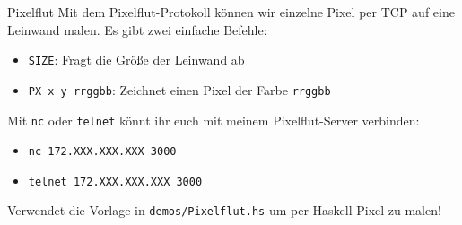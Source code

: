 \documentclass{beamer}
\begin{document}
\begin{frame}{Pixelflut}
  Mit dem Pixelflut-Protokoll können wir einzelne Pixel per TCP auf eine Leinwand malen.
  Es gibt zwei einfache Befehle:

  \begin{itemize}
    \item \texttt{SIZE}: Fragt die Größe der Leinwand ab
    \item \texttt{PX x y rrggbb}: Zeichnet einen Pixel der Farbe \texttt{rrggbb}
  \end{itemize}

  Mit \texttt{nc} oder \texttt{telnet} könnt ihr euch mit meinem Pixelflut-Server verbinden:

  \begin{itemize}
    \item \texttt{nc 172.XXX.XXX.XXX 3000}
    \item \texttt{telnet 172.XXX.XXX.XXX 3000}
  \end{itemize}

  Verwendet die Vorlage in \texttt{demos/Pixelflut.hs} um per Haskell Pixel zu malen!
\end{frame}
\end{document}
